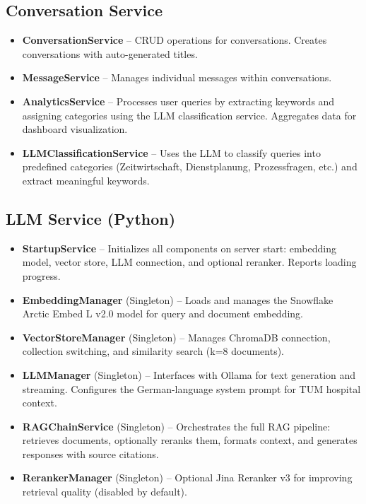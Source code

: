 \documentclass[a4paper,12pt]{report}
\begin{document}
\subsection{Conversation Service}

\begin{itemize}
    \item \textbf{ConversationService} -- CRUD operations for conversations. Creates conversations with auto-generated titles.
    \item \textbf{MessageService} -- Manages individual messages within conversations.
    \item \textbf{AnalyticsService} -- Processes user queries by extracting keywords and assigning categories using the LLM classification service. Aggregates data for dashboard visualization.
    \item \textbf{LLMClassificationService} -- Uses the LLM to classify queries into predefined categories (Zeitwirtschaft, Dienstplanung, Prozessfragen, etc.) and extract meaningful keywords.
\end{itemize}

\subsection{LLM Service (Python)}

\begin{itemize}
    \item \textbf{StartupService} -- Initializes all components on server start: embedding model, vector store, LLM connection, and optional reranker. Reports loading progress.
    \item \textbf{EmbeddingManager} (Singleton) -- Loads and manages the Snowflake Arctic Embed L v2.0 model for query and document embedding.
    \item \textbf{VectorStoreManager} (Singleton) -- Manages ChromaDB connection, collection switching, and similarity search (k=8 documents).
    \item \textbf{LLMManager} (Singleton) -- Interfaces with Ollama for text generation and streaming. Configures the German-language system prompt for TUM hospital context.
    \item \textbf{RAGChainService} (Singleton) -- Orchestrates the full RAG pipeline: retrieves documents, optionally reranks them, formats context, and generates responses with source citations.
    \item \textbf{RerankerManager} (Singleton) -- Optional Jina Reranker v3 for improving retrieval quality (disabled by default).
\end{itemize}
\end{document}
